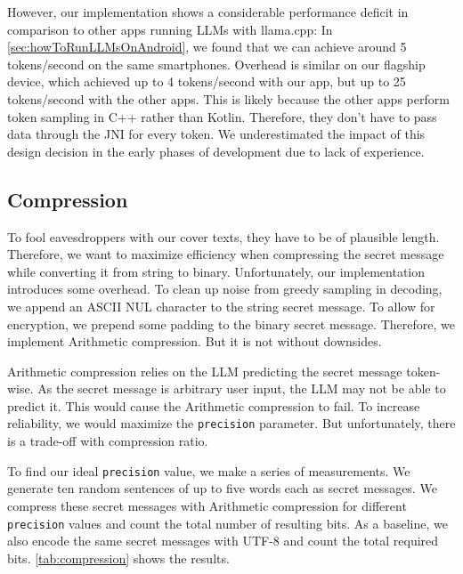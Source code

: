 However, our implementation shows a considerable performance deficit in comparison to other apps running \glspl{LLM} with llama.cpp: In \cref{sec:howToRunLLMsOnAndroid}, we found that we can achieve around 5 tokens/second on the same smartphones. Overhead is similar on our flagship device, which achieved up to 4 tokens/second with our app, but up to 25 tokens/second with the other apps. This is likely because the other apps perform token sampling in C++ rather than Kotlin. Therefore, they don't have to pass data through the \gls{JNI} for every token. We underestimated the impact of this design decision in the early phases of development due to lack of experience.

\subsection{Compression}
\label{sec:compression}
To fool eavesdroppers with our cover texts, they have to be of plausible length. Therefore, we want to maximize efficiency when compressing the secret message while converting it from string to binary. Unfortunately, our implementation introduces some overhead. To clean up noise from greedy sampling in decoding, we append an ASCII NUL character to the string secret message. To allow for encryption, we prepend some padding to the binary secret message. Therefore, we implement Arithmetic compression. But it is not without downsides.

Arithmetic compression relies on the \gls{LLM} predicting the secret message token-wise. As the secret message is arbitrary user input, the \gls{LLM} may not be able to predict it. This would cause the Arithmetic compression to fail. To increase reliability, we would maximize the \lstinline|precision| parameter. But unfortunately, there is a trade-off with compression ratio.

To find our ideal \lstinline|precision| value, we make a series of measurements. We generate ten random sentences of up to five words each as secret messages. We compress these secret messages with Arithmetic compression for different \lstinline|precision| values and count the total number of resulting bits. As a baseline, we also encode the same secret messages with UTF-8 and count the total required bits. \cref{tab:compression} shows the results.

